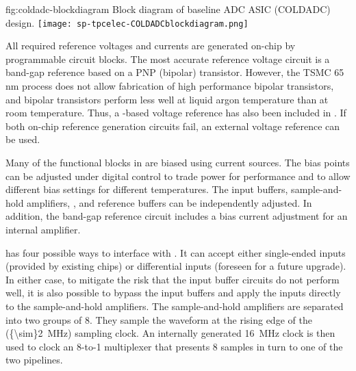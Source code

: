 \begin{dunefigure}
{fig:coldadc-blockdiagram}
{Block diagram of baseline ADC ASIC (COLDADC) design.}
\texttt{[image: sp-tpcelec-COLDADCblockdiagram.png]}
\end{dunefigure}


All required reference voltages and currents are generated on-chip by programmable circuit blocks.  The most accurate reference voltage circuit is a band-gap reference based on a PNP (bipolar) transistor.  However, the TSMC 65 nm  process does not allow fabrication of high performance bipolar transistors, and bipolar transistors perform less well at liquid argon temperature than at room temperature.  Thus, a -based voltage reference has also been included in .  If both on-chip reference generation circuits fail, an external voltage reference can be used.

Many of the functional blocks in  are biased using current sources.  The bias points can be adjusted under digital control to trade power for performance and to allow different bias settings for different temperatures.  The input buffers, sample-and-hold amplifiers, , and  reference buffers can be independently adjusted.  In addition, the band-gap reference circuit includes a bias current adjustment for an internal amplifier.

 has four possible ways to interface with .  It can accept either single-ended inputs (provided by existing  chips) or differential inputs (foreseen for a future  upgrade).  In either case, to mitigate the risk that the input buffer circuits do not perform well, it is also possible to bypass the input buffers and apply the inputs directly to the sample-and-hold amplifiers.  The sample-and-hold amplifiers are separated into two groups of 8.  They sample the waveform at the rising edge of the (\SI{{\sim}2}{MHz}) sampling clock.  An internally generated \SI{16}{MHz} clock is then used to clock an 8-to-1 multiplexer that presents 8 samples in turn to one of the two  pipelines.

